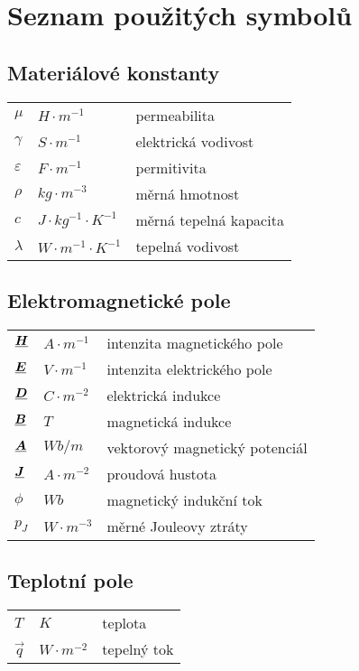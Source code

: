 \chapter{Seznam použitých symbolů}

\section{Materiálové konstanty}
\begin{tabular}{lll}
	$\mu$ & $\unit{H\cdot m^{-1}}$ & permeabilita\\
	$\gamma$ & $\unit{S\cdot m^{-1}}$ & elektrická vodivost\\
	$\varepsilon$ & $\unit{F\cdot m^{-1}}$ & permitivita\\
	$\rho$ & $\unit{kg\cdot m^{-3}}$ & měrná hmotnost\\
	$c$ & $\unit{J\cdot kg^{-1}\cdot K^{-1}}$ & měrná tepelná kapacita\\
	$\lambda$ & $\unit{W\cdot m^{-1}\cdot K^{-1}}$ & tepelná vodivost\\
\end{tabular}

\section{Elektromagnetické pole}
\begin{tabular}{lll}
	$\mbox{\underline{\boldmath$H$}}$ & $\unit{A\cdot m^{-1}}$ & intenzita magnetického pole\\
	$\mbox{\underline{\boldmath$E$}}$ & $\unit{V\cdot m^{-1}}$ & intenzita elektrického pole\\
	$\mbox{\underline{\boldmath$D$}}$ & $\unit{C\cdot m^{-2}}$ & elektrická indukce\\
	$\mbox{\underline{\boldmath$B$}}$ & $\unit{T}$ & magnetická indukce\\
	$\mbox{\underline{\boldmath$A$}}$ & $\unit{Wb/m}$ & vektorový magnetický potenciál\\
	$\mbox{\underline{\boldmath$J$}}$ & $\unit{A\cdot m^{-2}}$ & proudová hustota\\
	$\phi$ & $\unit{Wb}$ & magnetický indukční tok\\
	$p_J$ & $\unit{W \cdot m^{-3}}$ & měrné Jouleovy ztráty\\
\end{tabular}

\section{Teplotní pole}
\begin{tabular}{lll}
	$T$ & $\unit{K}$ & teplota\\
	$\vec{q}$ & $\unit{W\cdot m^{-2}}$ & tepelný tok
\end{tabular}


